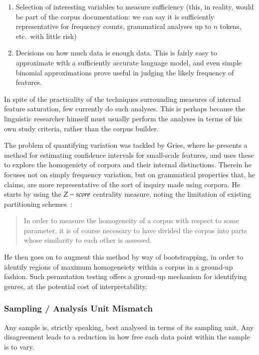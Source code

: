 \begin{enumerate}
 \item Selection of interesting variables to measure sufficiency (this, in reality, would be part of the corpus documentation: we can say it is sufficiently representative for frequency counts, grammatical analyses up to $n$ tokens, etc.\ with little risk)
 \item Decisions on how much data is enough data.  This is fairly easy to approximate with a sufficiently accurate language model, and even simple binomial approximations prove useful in judging the likely frequency of features.
\end{enumerate}

In spite of the practicality of the techniques surrounding measures of internal feature saturation, few currently do such analyses.  This is perhaps because the linguistic researcher himself must usually perform the analyses in terms of his own study criteria, rather than the corpus builder.

The problem of quantifying variation was tackled by Gries\cite{gries2006exploring}, where he presents a method for estimating confidence intervals for small-scale features, and uses these to explore the homogeniety of corpora and their internal distinctions.  Therein he focuses not on simply frequency variation, but on grammatical properties that, he claims, are more representative of the sort of inquiry made using corpora.  He starts by using the $Z\--\-score$ centrality measure, noting the limitation of existing partitioning schemes~\cite[p.123]{gries2006exploring}:

\begin{quote}
In order to measure the homogeneity of a corpus with respect to some parameter, it is of course necessary to have divided the corpus into parts whose similarity to each other is assessed. 
\end{quote}

He then goes on to augment this method by way of bootstrapping, in order to identify regions of maximum homogeneiety within a corpus in a ground-up fashion.  Such permutation testing offers a ground-up mechanism for identifying genres, at the potential cost of interpretability.




\subsubsection{Sampling / Analysis Unit Mismatch}
Any sample is, strictly speaking, best analysed in terms of its sampling unit.  Any disagreement leads to a reduction in how free each data point within the sample is to vary\cite{kilgarriff2005language,lijffijt2014significance,paquot2009distinctive}.

